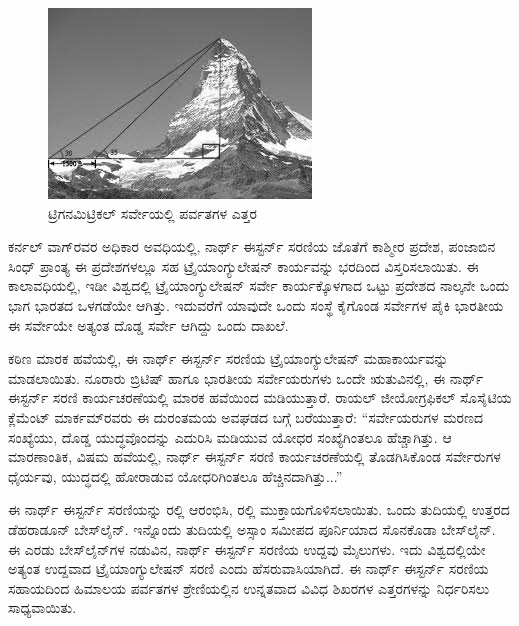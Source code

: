 \begin{figure}[!htbp]
\includegraphics[scale=1.2]{"images/image018.jpg"}
\caption{ಟ್ರಿಗನಮಿಟ್ರಿಕಲ್​ ಸರ್ವೇಯಲ್ಲಿ ಪರ್ವತಗಳ ಎತ್ತರ}\label{art14-fig1}
\end{figure}

ಕರ್ನಲ್​ ವಾಗ್​ರವರ ಅಧಿಕಾರ ಅವಧಿಯಲ್ಲಿ, ನಾರ್ಥ್ ಈಸ್ಟರ್ನ್ ಸರಣಿಯ ಜೊತೆಗೆ ಕಾಶ್ಮೀರ ಪ್ರದೇಶ, ಪಂಜಾಬಿನ ಸಿಂಧ್​ ಪ್ರಾಂತ್ಯ ಈ ಪ್ರದೇಶಗಳಲ್ಲೂ ಸಹ ಟ್ರೈಯಾಂಗ್ಯುಲೇಷನ್​ ಕಾರ್ಯವನ್ನು ಭರದಿಂದ ವಿಸ್ತರಿಸಲಾಯಿತು. ಈ ಕಾಲಾವಧಿಯಲ್ಲಿ, ಇಡೀ ವಿಶ್ವದಲ್ಲಿ ಟ್ರೈಯಾಂಗ್ಯುಲೇಷನ್​ ಸರ್ವೇ ಕಾರ್ಯಕ್ಕೊಳಗಾದ ಒಟ್ಟು ಪ್ರದೇಶದ ನಾಲ್ಕನೇ ಒಂದು ಭಾಗ ಭಾರತದ ಒಳಗಡೆಯೇ ಆಗಿತ್ತು. ಇದುವರೆಗೆ ಯಾವುದೇ ಒಂದು ಸಂಸ್ಥೆ ಕೈಗೊಂಡ ಸರ್ವೇಗಳ ಪೈಕಿ ಭಾರತೀಯ ಈ ಸರ್ವೇಯೇ ಅತ್ಯಂತ ದೊಡ್ಡ ಸರ್ವೇ ಆಗಿದ್ದು ಒಂದು ದಾಖಲೆ.

ಕಠಿಣ ಮಾರಕ ಹವೆಯಲ್ಲಿ, ಈ ನಾರ್ಥ್ ಈಸ್ಟರ್ನ್ ಸರಣಿಯ ಟ್ರೈಯಾಂಗ್ಯುಲೇಷನ್​ ಮಹಾಕಾರ್ಯವನ್ನು ಮಾಡಲಾಯಿತು. ನೂರಾರು ಬ್ರಿಟಿಷ್​ ಹಾಗೂ ಭಾರತೀಯ ಸರ್ವೇಯರುಗಳು ಒಂದೇ ಋತುವಿನಲ್ಲಿ, ಈ ನಾರ್ಥ್ ಈಸ್ಟರ್ನ್ ಸರಣಿ ಕಾರ್ಯಚರಣೆಯಲ್ಲಿ ಮಾರಕ ಹವೆಯಿಂದ ಮಡಿಯುತ್ತಾರೆ. ರಾಯಲ್​ ಜೀಯೋಗ್ರಫಿಕಲ್​ ಸೊಸೈಟಿಯ ಕ್ಲೆಮೆಂಟ್​ ಮಾರ್ಕಮ್‌ರವರು ಈ ದುರಂತಮಯ ಅವಘಡದ ಬಗ್ಗೆ ಬರೆಯುತ್ತಾರೆ: “ಸರ್ವೇಯರುಗಳ ಮರಣದ ಸಂಖ್ಯೆಯು, ದೊಡ್ಡ ಯುದ್ಧವೊಂದನ್ನು ಎದುರಿಸಿ ಮಡಿಯುವ ಯೋಧರ ಸಂಖ್ಯೆಗಿಂತಲೂ ಹೆಚ್ಚಾಗಿತ್ತು. ಆ ಮಾರಣಾಂತಿಕ, ವಿಷಮ ಹವೆಯಲ್ಲಿ, ನಾರ್ಥ್ ಈಸ್ಟರ್ನ್ ಸರಣಿ ಕಾರ್ಯಚರಣೆಯಲ್ಲಿ ತೊಡಗಿಸಿಕೊಂಡ ಸರ್ವೇರುಗಳ ಧೈರ್ಯವು, ಯುದ್ಧದಲ್ಲಿ ಹೋರಾಡುವ ಯೋಧರಿಗಿಂತಲೂ ಹೆಚ್ಚಿನದಾಗಿತ್ತು...”

ಈ ನಾರ್ಥ್ ಈಸ್ಟರ್ನ್ ಸರಣಿಯನ್ನು  ರಲ್ಲಿ ಆರಂಭಿಸಿ,  ರಲ್ಲಿ ಮುಕ್ತಾಯಗೊಳಿಸಲಾಯಿತು. ಒಂದು ತುದಿಯಲ್ಲಿ ಉತ್ತರದ ಡೆಹರಾಡೂನ್​ ಬೇಸ್‌ಲೈನ್​. ಇನ್ನೊಂದು ತುದಿಯಲ್ಲಿ ಅಸ್ಸಾಂ ಸಮೀಪದ ಪೂರ್ನಿಯಾದ ಸೊನಕೊಡಾ ಬೇಸ್‌ಲೈನ್​. ಈ ಎರಡು ಬೇಸ್‌ಲೈನ್​ಗಳ ನಡುವಿನ, ನಾರ್ಥ್ ಈಸ್ಟರ್ನ್ ಸರಣಿಯ ಉದ್ದವು  ಮೈಲುಗಳು. ಇದು ವಿಶ್ವದಲ್ಲಿಯೇ ಅತ್ಯಂತ ಉದ್ದವಾದ ಟ್ರೈಯಾಂಗ್ಯುಲೇಷನ್​ ಸರಣಿ ಎಂದು ಹೆಸರುವಾಸಿಯಾಗಿದೆ. ಈ ನಾರ್ಥ್ ಈಸ್ಟರ್ನ್ ಸರಣಿಯ ಸಹಾಯದಿಂದ ಹಿಮಾಲಯ ಪರ್ವತಗಳ ಶ್ರೇಣಿಯಲ್ಲಿನ ಉನ್ನತವಾದ  ವಿವಿಧ ಶಿಖರಗಳ ಎತ್ತರಗಳನ್ನು ನಿರ್ಧರಿಸಲು ಸಾಧ್ಯವಾಯಿತು.

